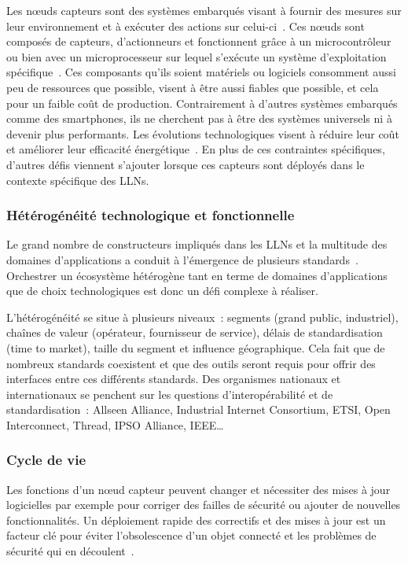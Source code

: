 Les nœuds capteurs sont des systèmes embarqués visant à fournir des mesures sur leur environnement et à exécuter des actions sur celui-ci~\cite{kopetz2011real}.
Ces nœuds sont composés de capteurs, d'actionneurs et fonctionnent grâce à un microcontrôleur ou bien avec un microprocesseur sur lequel s’exécute un système d'exploitation spécifique~\cite{dunkels2004contiki}.
Ces composants qu'ils soient matériels ou logiciels consomment aussi peu de ressources que possible, visent à être aussi fiables que possible, et cela pour un faible coût de production.
Contrairement à d'autres systèmes embarqués comme des smartphones, ils ne cherchent pas à être des systèmes universels ni à devenir plus performants.
Les évolutions technologiques visent à réduire leur coût et améliorer leur efficacité énergétique~\cite{koomey2011implications}.
En plus de ces contraintes spécifiques, d'autres défis viennent s'ajouter lorsque ces capteurs sont déployés dans le contexte spécifique des \ac{LLN}s.

\subsubsection{Hétérogénéité technologique et fonctionnelle}

Le grand nombre de constructeurs impliqués dans les \ac{LLN}s et la multitude des domaines d'applications a conduit à l'émergence de plusieurs standards~\cite{bandyopadhyay2011internet}.
Orchestrer un écosystème hétérogène tant en terme de domaines d'applications que de choix technologiques est donc un défi complexe à réaliser.

L'hétérogénéité se situe à plusieurs niveaux~: segments (grand public, industriel), chaînes de valeur (opérateur, fournisseur de service), délais de standardisation (time to market), taille du segment et influence géographique.
Cela fait que de nombreux standards coexistent et que des outils seront requis pour offrir des interfaces entre ces différents standards.
Des organismes nationaux et internationaux se penchent sur les questions d'interopérabilité et de standardisation~: Allseen Alliance, Industrial Internet Consortium, ETSI, Open Interconnect, Thread, IPSO Alliance, IEEE\ldots

\subsubsection{Cycle de vie}

Les fonctions d'un nœud capteur peuvent changer et nécessiter des mises à jour logicielles par exemple pour corriger des failles de sécurité ou ajouter de nouvelles fonctionnalités.
Un déploiement rapide des correctifs et des mises à jour est un facteur clé pour éviter l’obsolescence d'un objet connecté et les problèmes de sécurité qui en découlent~\cite{pathan2006security, wang2006survey}.

